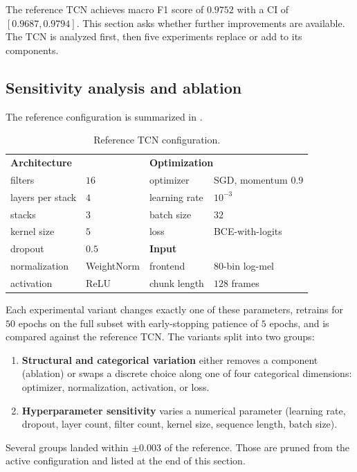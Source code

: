 The reference TCN achieves macro F1 score of $0.9752$ with a CI of $[0.9687, 0.9794]$.
This section asks whether further improvements are available.
The TCN is analyzed first, then five experiments replace or add to its components.

\subsection{Sensitivity analysis and ablation}
\label{subsec:exp_sensitivity}

The reference configuration is summarized in .

\begin{table}[h]
\centering
\small
\begin{tabular}{l l @{\hskip 2em} l l}
\toprule
\multicolumn{2}{l}{\textbf{Architecture}} & \multicolumn{2}{l}{\textbf{Optimization}} \\
\addlinespace
filters          & $16$         & optimizer     & SGD, momentum $0.9$ \\
layers per stack & $4$          & learning rate & $10^{-3}$ \\
stacks           & $3$          & batch size    & $32$ \\
kernel size      & $5$          & loss          & BCE-with-logits \\
\addlinespace
dropout          & $0.5$        & \multicolumn{2}{l}{\textbf{Input}} \\
\addlinespace
normalization    & WeightNorm   & frontend      & $80$-bin log-mel \\
activation       & ReLU         & chunk length  & $128$ frames \\
\bottomrule
\end{tabular}
\caption{Reference TCN configuration.}
\label{tab:reference_config}
\end{table}

Each experimental variant changes exactly one of these parameters, retrains for $50$ epochs on the full subset with early-stopping patience of $5$ epochs, and is compared against the reference TCN.
The variants split into two groups:
\begin{enumerate}
    \item \textbf{Structural and categorical variation} either removes a component (ablation) or swaps a discrete choice along one of four categorical dimensions: optimizer, normalization, activation, or loss.
    \item \textbf{Hyperparameter sensitivity} varies a numerical parameter (learning rate, dropout, layer count, filter count, kernel size, sequence length, batch size).
\end{enumerate}
Several groups landed within $\pm 0.003$ of the reference.
Those are pruned from the active configuration and listed at the end of this section.

